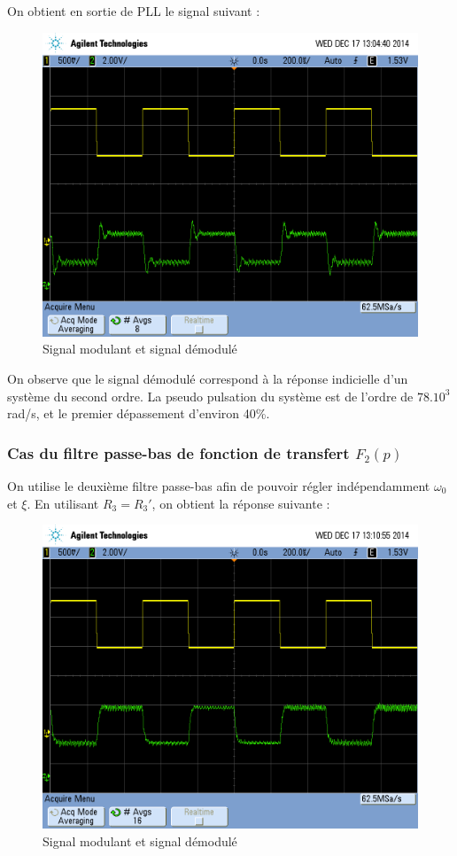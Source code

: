 \documentclass[../../Cours_M1.tex]{subfiles}
\begin{document}
On obtient en sortie de PLL le signal suivant :

\begin{figure}[h!]
\centering
\includegraphics[width=\textwidth]{moddemod.png}
\caption{Signal modulant et signal démodulé}
\end{figure}

On observe que le signal démodulé correspond à la réponse indicielle d'un système du second ordre. La pseudo pulsation du système est de l'ordre de $78.10^{3}$rad/s, et le premier dépassement d'environ 40\%.

\newpage
\subsubsection{Cas du filtre passe-bas de fonction de transfert $F_2(p)$}

On utilise le deuxième filtre passe-bas afin de pouvoir régler indépendamment $\omega_0$ et $\xi$. En utilisant $R_3=R_3'$, on obtient la réponse suivante :

\begin{figure}[h!]
\centering
\includegraphics[width=\textwidth]{moddemod2R.png}
\caption{Signal modulant et signal démodulé}
\end{figure}
\end{document}
